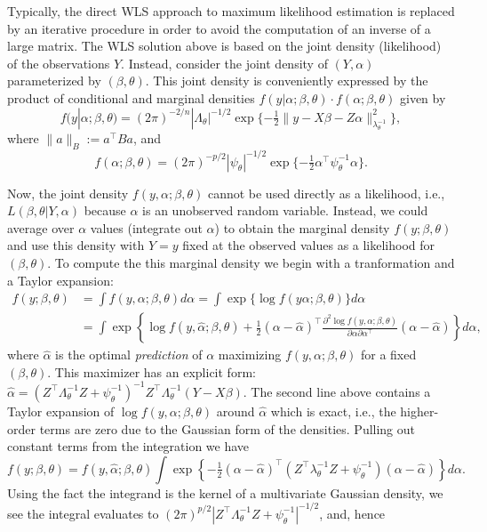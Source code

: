 \documentclass[
]{book}
\begin{document}
Typically, the direct WLS approach to maximum likelihood estimation is replaced by an iterative procedure in order to avoid the computation of an inverse of a large matrix. The WLS solution above is based on the joint density (likelihood) of the observations \(Y\). Instead, consider the joint density of \((Y,\alpha)\) parameterized by \((\beta, \theta)\). This joint density is conveniently expressed by the product of conditional and marginal densities \(f(y|\alpha;\beta,\theta)\cdot f(\alpha;\beta,\theta)\) given by
\[f(y|\alpha;\beta,\theta) = (2\pi)^{-2/n}|\Lambda_\theta|^{-1/2}\exp\{-\tfrac12\|y - X\beta - Z\alpha\|^2_{\lambda_\theta^{-1}}\},\]
where \(\|a\|_B := a^\top Ba\), and
\[f(\alpha;\beta,\theta) = (2\pi)^{-p/2}|\psi_\theta|^{-1/2}\exp\{-\tfrac12\alpha^\top \psi_\theta^{-1}\alpha\}.\]

Now, the joint density \(f(y,\alpha;\beta,\theta)\) cannot be used directly as a likelihood, i.e., \(L(\beta, \theta| Y,\alpha)\) because \(\alpha\) is an unobserved random variable. Instead, we could average over \(\alpha\) values (integrate out \(\alpha\)) to obtain the marginal density \(f(y;\beta,\theta)\) and use this density with \(Y=y\) fixed at the observed values as a likelihood for \((\beta, \theta)\). To compute the this marginal density we begin with a tranformation and a Taylor expansion:
\begin{align*}
f(y;\beta, \theta) &= \int f(y,\alpha;\beta, \theta)d\alpha = \int \exp\{\log f(y\alpha;\beta,\theta)\}d\alpha \\ 
& = \int \exp\left\{\log f(y,\hat\alpha;\beta,\theta) + \tfrac12 (\alpha -\hat\alpha)^\top \frac{\partial^2 \log f(y,\alpha;\beta,\theta)}{\partial \alpha \partial\alpha^\top}(\alpha - \hat\alpha)\right\}d\alpha,
\end{align*}
where \(\hat\alpha\) is the optimal \emph{prediction} of \(\alpha\) maximizing \(f(y,\alpha;\beta,\theta)\) for a fixed \((\beta,\theta)\). This maximizer has an explicit form: \(\hat\alpha = (Z^\top \Lambda_\theta^{-1}Z + \psi_\theta^{-1})^{-1}Z^\top \Lambda_\theta^{-1}(Y - X\beta)\). The second line above contains a Taylor expansion of \(\log f(y,\alpha;\beta,\theta)\) around \(\hat\alpha\) which is exact, i.e., the higher-order terms are zero due to the Gaussian form of the densities. Pulling out constant terms from the integration we have
\[f(y;\beta, \theta) = f(y, \hat\alpha;\beta, \theta)\int \exp\left\{-\tfrac12 (\alpha -\hat\alpha)^\top (Z^\top \lambda_\theta^{-1}Z + \psi_\theta^{-1})(\alpha - \hat\alpha)\right\}d\alpha.\]
Using the fact the integrand is the kernel of a multivariate Gaussian density, we see the integral evaluates to \((2\pi)^{p/2}|Z^\top \Lambda_\theta^{-1}Z+\psi_\theta^{-1}|^{-1/2}\), and, hence
\end{document}
